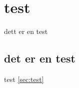 \chapter{test}

dett er en test 
\section{det  er en test}\label{sec:test}

\newpage
test \autoref{sec:test}
